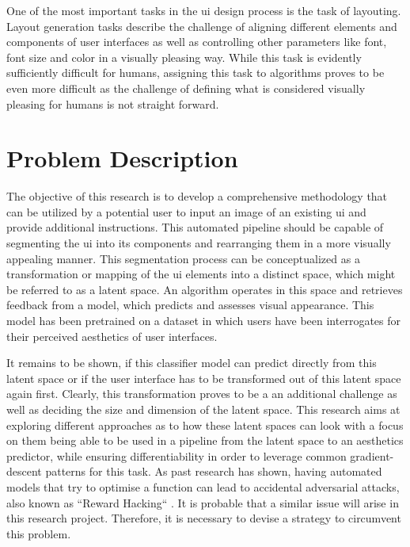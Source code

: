 \documentclass[10pt,a4paper]{scrartcl} %
\begin{document}
One of the most important tasks in the \ac{ui} design process is the task of layouting. Layout generation tasks describe the challenge of aligning different elements and components of user interfaces as well as controlling other parameters like font, font size and color in a visually pleasing way. While this task is evidently sufficiently difficult for humans, assigning this task to algorithms proves to be even more difficult as the challenge of defining what is considered visually pleasing for humans is not straight forward. \cite{LAVIE2004269}

\section{Problem Description}
The objective of this research is to develop a comprehensive methodology that can be utilized by a potential user to input an image of an existing \ac{ui} and provide additional instructions. This automated pipeline should be capable of segmenting the \ac{ui} into its components and rearranging them in a more visually appealing manner. This segmentation process can be conceptualized as a transformation or mapping of the \ac{ui} elements into a distinct space, which might be referred to as a latent space. An algorithm operates in this space and retrieves feedback from a model, which predicts and assesses visual appearance. This model has been pretrained on a dataset in which users have been interrogates for their perceived aesthetics of user interfaces. 
 
 It remains to be shown, if this classifier model can predict directly from this latent space or if the user interface has to be transformed out of this latent space again first. 
 Clearly, this transformation proves to be a an additional challenge as well as deciding the size and dimension of the latent space. This research aims at exploring different approaches as to how these latent spaces can look with a focus on them being able to be used in a pipeline from the latent space to an aesthetics predictor, while ensuring differentiability in order to leverage common gradient-descent patterns for this task.
 As past research has shown, having automated models that try to optimise a function can lead to accidental adversarial attacks, also known as ``Reward Hacking`` \cite{NEURIPS2022_3d719fee}. It is probable that a similar issue will arise in this research project. Therefore, it is necessary to devise a strategy to circumvent this problem.
\end{document}
